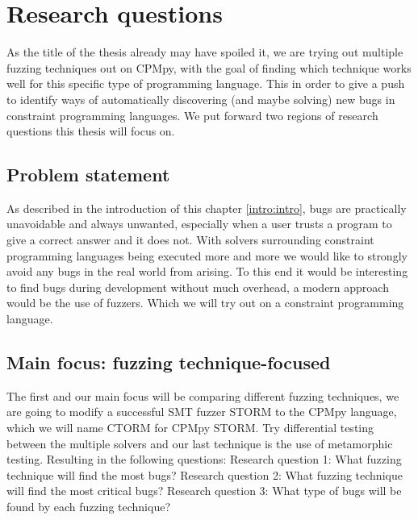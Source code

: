 \section{Research questions}
\label{intro:RQ:RQ's}
As the title of the thesis already may have spoiled it, we are trying out multiple fuzzing techniques out on CPMpy, with the goal of finding which technique works well for this specific type of programming language. This in order to give a push to identify ways of automatically discovering (and maybe solving) new bugs in constraint programming languages. We put forward two regions of research questions this thesis will focus on.

\subsection{Problem statement}
\label{intro:ProblemStatment}
As described in the introduction of this chapter \ref{intro:intro}, bugs are practically unavoidable and always unwanted, especially when a user trusts a program to give a correct answer and it does not. With solvers surrounding constraint programming languages being executed more and more we would like to strongly avoid any bugs in the real world from arising. To this end it would be interesting to find bugs during development without much overhead, a modern approach would be the use of fuzzers. Which we will try out on a constraint programming language.

\subsection{Main focus: fuzzing technique-focused}
\label{intro:RQ:MainFocus}
The first and our main focus will be comparing different fuzzing techniques, we are going to modify a successful SMT fuzzer STORM to the CPMpy language, which we will name CTORM for CPMpy STORM. Try differential testing between the multiple solvers and our last technique is the use of metamorphic testing. Resulting in the following questions: \newline
Research question 1: What fuzzing technique will find the most bugs? \newline 
Research question 2: What fuzzing technique will find the most critical bugs? \newline
Research question 3: What type of bugs will be found by each fuzzing technique? \newline

